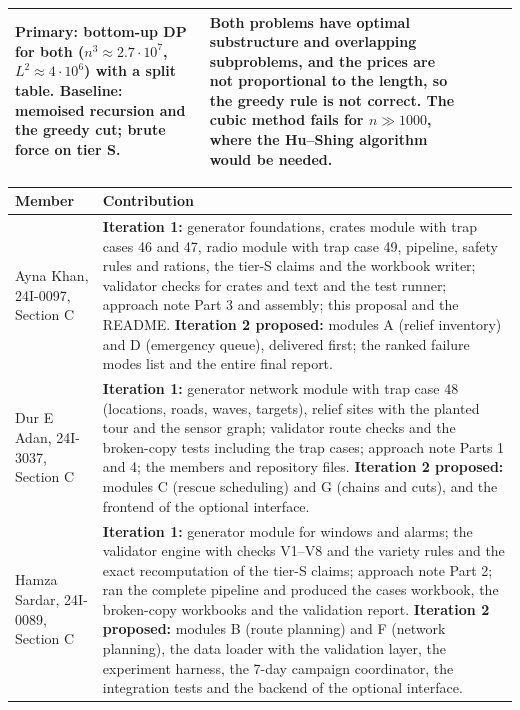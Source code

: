 \documentclass[a4paper]{article}
\begin{document}
\begin{tabularx}{\textwidth}{@{}P{1.7cm} P{5.6cm} P{6.0cm} P{3.8cm} Y@{}}
Primary: bottom-up DP for both ($n^3\approx 2.7\cdot 10^7$, $L^2\approx 4\cdot 10^6$) with a split table. Baseline: memoised recursion and the greedy cut; brute force on tier S. &
Both problems have optimal substructure and overlapping subproblems, and the prices are not proportional to the length, so the greedy rule is not correct. The cubic method fails for $n\gg 1000$, where the Hu--Shing algorithm would be needed.\\
\bottomrule
\end{tabularx}

\newpage
\fontsize{11}{15}\selectfont
\renewcommand{\arraystretch}{1.5}
\setlength{\tabcolsep}{6pt}
\noindent
\begin{tabularx}{\textwidth}{@{}P{4.4cm} Y@{}}
\toprule
\textbf{Member} & \textbf{Contribution}\\
\midrule
Ayna Khan, 24I-0097, Section C &
\textbf{Iteration 1:} generator foundations, crates module with trap cases 46 and 47, radio module with trap case 49, pipeline, safety rules and rations, the tier-S claims and the workbook writer; validator checks for crates and text and the test runner; approach note Part 3 and assembly; this proposal and the README. \textbf{Iteration 2 proposed:} modules A (relief inventory) and D (emergency queue), delivered first; the ranked failure modes list and the entire final report.\\
Dur E Adan, 24I-3037, Section C &
\textbf{Iteration 1:} generator network module with trap case 48 (locations, roads, waves, targets), relief sites with the planted tour and the sensor graph; validator route checks and the broken-copy tests including the trap cases; approach note Parts 1 and 4; the members and repository files. \textbf{Iteration 2 proposed:} modules C (rescue scheduling) and G (chains and cuts), and the frontend of the optional interface.\\
Hamza Sardar, 24I-0089, Section C &
\textbf{Iteration 1:} generator module for windows and alarms; the validator engine with checks V1--V8 and the variety rules and the exact recomputation of the tier-S claims; approach note Part 2; ran the complete pipeline and produced the cases workbook, the broken-copy workbooks and the validation report. \textbf{Iteration 2 proposed:} modules B (route planning) and F (network planning), the data loader with the validation layer, the experiment harness, the 7-day campaign coordinator, the integration tests and the backend of the optional interface.\\
\bottomrule
\end{tabularx}
\end{document}
